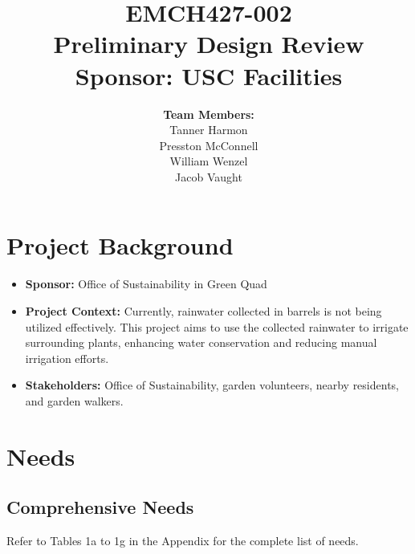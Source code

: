 \documentclass[12pt]{article}
\begin{document}
\title{
    \vspace{2in}
    \textbf{EMCH427-002} \\[1ex]
    \textbf{Preliminary Design Review} \\[1ex]
    \textbf{Sponsor: USC Facilities} \\[1ex]
    \vspace{2in}
}

\author{
    \textbf{Team Members:} \\[2ex]
    Tanner Harmon\\[1ex]
    Presston McConnell\\[1ex]
    William Wenzel\\[1ex]
    Jacob Vaught\\[2ex]
}

\date{}

\maketitle
\thispagestyle{fancy}

\newpage

\section{Project Background}

\begin{itemize}
    \item \textbf{Sponsor:} Office of Sustainability in Green Quad
    \item \textbf{Project Context:} Currently, rainwater collected in barrels is not being utilized effectively. This project aims to use the collected rainwater to irrigate surrounding plants, enhancing water conservation and reducing manual irrigation efforts.
    \item \textbf{Stakeholders:} Office of Sustainability, garden volunteers, nearby residents, and garden walkers.
\end{itemize}

\section{Needs}
\subsection{Comprehensive Needs} 
Refer to Tables 1a to 1g in the Appendix for the complete list of needs.
\end{document}
